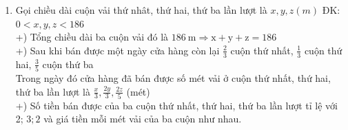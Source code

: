 \begin{bt}
{\begin{enumerate}
            Theo bài ra ta có:\\[5pt]
            $\left|2019 x_1-2018 y_1\right|+\left|2019 x_2-2018 y_2\right|+\ldots+\left|2019 x_{2018}-2018 y_{2018}\right| \leq 0$\\[5pt]
            Suy ra:\\[5pt]
            $\left\{\begin{array}{c}
            \left|2019 x_1-2018 y_1\right|=0 \\
            \left|2019 x_2-2018 y_2\right|=0 \\
            \vdots \\
            \left|2019 x_{2018}-2018 y_{2018}\right|=0
            \end{array}\right. \\
            \Rightarrow\left\{\begin{array}{c}
            2019 x_1=2018 y_1 \\
            2019 x_2=2018 y_2 \\
            \vdots \\
            2019 x_{2018}=2018 y_{18}
            \end{array}\\[5pt] \Rightarrow \frac{x_1}{y_1}=\frac{x_2}{y_2}=\ldots=\frac{x_{2018}}{y_{2018}}=\frac{2018}{2019}\right. \\[5pt]$
            Áp dụng tính chất của dãy tỉ số bằng nhau ta được:\\[5pt]
            $\frac{x_1}{y_1}=\frac{x_2}{y_2}=\ldots=\frac{x_{2018}}{y_{2018}}=\frac{x_1+x_2+\ldots+x_{2018}}{y_1+y_2+\ldots+y_{2018}} \\[5pt]
            \text {Từ (1) và (2) suy ra } \frac{x_1+x_2+x_3+\ldots+x_{2018}}{y_1+y_2+y_3+\ldots+y_{2018}}=\frac{2018}{2019}$(đpcm)
            \item Gọi chiều dài cuộn vải thứ nhât, thứ hai, thứ ba lần lượt là $x, y, z(m)$ ĐK: $0<x, y, z<186$\\[5pt]
            +) Tổng chiều dài ba cuộn vải đó là $186 \mathrm{~m} \Rightarrow \mathrm{x}+\mathrm{y}+\mathrm{z}=186$\\[5pt]
            +) Sau khi bán được một ngày cửa hàng còn lại $\frac{2}{3}$ cuộn thứ nhất, $\frac{1}{3}$ cuộn thứ hai, $\frac{3}{5}$ cuộn thứ ba\\[5pt]
            Trong ngày đó cửa hàng đã bán được số mét vải ở cuộn thứ nhất, thứ hai, thứ ba lần lượt là $\frac{x}{3}, \frac{2 y}{3}, \frac{2 z}{5}$ (mét)\\[5pt]
            +) Số tiền bán được của ba cuộn thứ nhất, thứ hai, thứ ba lần lượt tỉ lệ với 2; $3 ; 2$ và giá tiền mỗi mét vải của ba cuộn như nhau.\\[5pt]

\end{enumerate}}
\end{bt}
